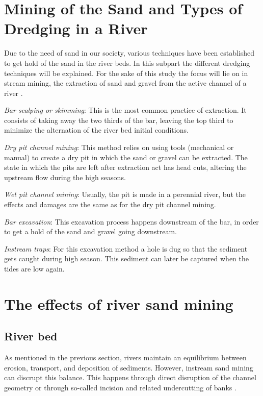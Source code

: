 \section{Mining of the Sand and Types of Dredging in a River}
Due to the need of sand in our society, various techniques have been established to get hold of the sand in the river beds. In this subpart the different dredging techniques will be explained.
For the sake of this study the focus will lie on in stream mining, the extraction of sand and gravel from the active channel of a river \autocite{sand-mining-boek}.

\textit{Bar scalping or skimming}:
This is the most common practice of extraction. It consists of taking away the two thirds of the bar, leaving the top third to minimize the alternation of the river bed initial conditions.

\textit{Dry pit channel mining}:
This method relies on using tools (mechanical or manual) to create a dry pit in which the sand or gravel can be extracted. The state in which the pits are left after extraction act has head cuts, altering the upstream flow during the high seasons. \cite{}

\textit{Wet pit channel mining}:
Usually, the pit is made in a perennial river, but the effects and damages are the same as for the dry pit channel mining.

\textit{Bar excavation}:
This excavation process happens downstream of the bar, in order to get a hold of the sand and gravel going downstream.

\textit{Instream traps}:
For this excavation method a hole is dug so that the sediment gets caught during high season. This sediment can later be captured when the tides are low again.



\section{The effects of river sand mining}
\subsection{River bed}
As mentioned in the previous section, rivers maintain an equilibrium between erosion, transport, and deposition of sediments. However, instream sand mining can discrupt this balance. This happens through direct disruption of the channel geometry or through so-called incision and related undercutting of banks .


